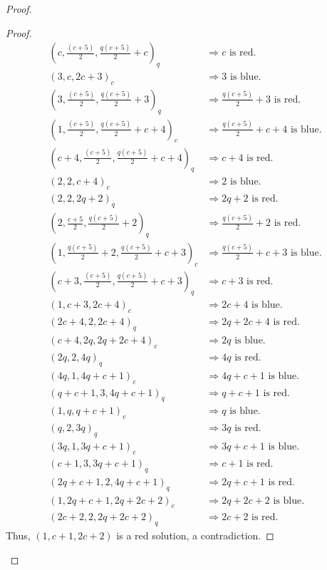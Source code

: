 \documentclass[preprint,12pt]{elsarticle}
\theoremstyle{plain}
\theoremstyle{definition}
\begin{document}
\begin{proof}
\begin{proof}
\begin{align*}
(c,\tfrac{(c+5)}{2},\tfrac{q(c+5)}{2}+c)_q&\Longrightarrow c \text{ is red.}\\
(3,c,2c+3)_c&\Longrightarrow 3 \text{ is blue.}\\
(3,\tfrac{(c+5)}{2},\tfrac{q(c+5)}{2}+3)_q&\Longrightarrow \tfrac{q(c+5)}{2}+3 \text{ is red.}\\
(1,\tfrac{(c+5)}{2},\tfrac{q(c+5)}{2}+c+4)_c&\Longrightarrow \tfrac{q(c+5)}{2}+c+4\text{ is blue.}\\
(c+4,\tfrac{(c+5)}{2},\tfrac{q(c+5)}{2}+c+4)_q&\Longrightarrow c+4\text{ is red.}\\
(2,2,c+4)_c&\Longrightarrow 2 \text{ is blue.}\\
(2,2,2q+2)_q&\Longrightarrow 2q+2 \text{ is red.}\\
(2,\tfrac{c+5}{2},\tfrac{q(c+5)}{2}+2)_q&\Longrightarrow \tfrac{q(c+5)}{2}+2 \text{ is red.}\\
(1,\tfrac{q(c+5)}{2}+2,\tfrac{q(c+5)}{2}+c+3)_c&\Longrightarrow \tfrac{q(c+5)}{2}+c+3 \text{ is blue.}\\
(c+3,\tfrac{(c+5)}{2},\tfrac{q(c+5)}{2}+c+3)_q&\Longrightarrow c+3 \text{ is red.}\\
(1,c+3,2c+4)_c&\Longrightarrow 2c+4 \text{ is blue.}\\
(2c+4,2,2c+4)_q&\Longrightarrow 2q+2c+4 \text{ is red.}\\
(c+4,2q,2q+2c+4)_c&\Longrightarrow 2q \text{ is blue.}\\
(2q,2,4q)_q&\Longrightarrow 4q \text{ is red.}\\
(4q,1,4q+c+1)_c&\Longrightarrow 4q+c+1 \text{ is blue.}\\
(q+c+1,3,4q+c+1)_q&\Longrightarrow q+c+1 \text{ is red.}\\
(1,q,q+c+1)_c&\Longrightarrow q \text{ is blue.}\\
(q,2,3q)_q&\Longrightarrow 3q \text{ is red.}\\
(3q,1,3q+c+1)_c&\Longrightarrow 3q+c+1 \text{ is blue.}\\
(c+1,3,3q+c+1)_q&\Longrightarrow c+1 \text{ is red.}\\
(2q+c+1,2,4q+c+1)_q&\Longrightarrow 2q+c+1 \text{ is red.}\\
(1,2q+c+1,2q+2c+2)_c&\Longrightarrow 2q+2c+2 \text{ is blue.}\\
(2c+2,2,2q+2c+2)_q&\Longrightarrow 2c+2 \text{ is red.}
\end{align*}
Thus, $(1,c+1,2c+2)$ is a red solution, a contradiction.


\end{proof}
\end{proof}
\end{document}

